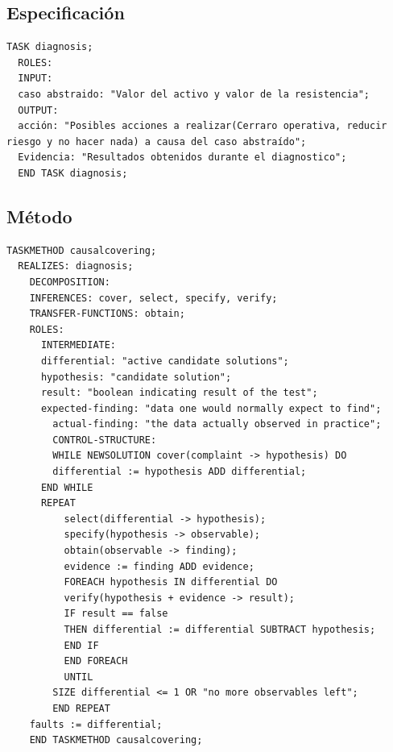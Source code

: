 \subsection{Especificación}

\begin{lstlisting}[style=Python-color, caption={Pseudocódigo de la especificación}]
  TASK diagnosis;
  ROLES:
  INPUT: 
  caso abstraido: "Valor del activo y valor de la resistencia";
  OUTPUT:
  acción: "Posibles acciones a realizar(Cerraro operativa, reducir riesgo y no hacer nada) a causa del caso abstraído";
  Evidencia: "Resultados obtenidos durante el diagnostico";
  END TASK diagnosis;
\end{lstlisting}

\subsection{Método}

\begin{lstlisting}[style=Python-color, caption={Pseudocódigo de Completo}]  
  TASKMETHOD causalcovering;
  REALIZES: diagnosis;
    DECOMPOSITION:
    INFERENCES: cover, select, specify, verify;
    TRANSFER-FUNCTIONS: obtain;
    ROLES:
      INTERMEDIATE:
      differential: "active candidate solutions";
      hypothesis: "candidate solution";
      result: "boolean indicating result of the test";
      expected-finding: "data one would normally expect to find";
        actual-finding: "the data actually observed in practice";
        CONTROL-STRUCTURE:
        WHILE NEWSOLUTION cover(complaint -> hypothesis) DO
        differential := hypothesis ADD differential;
      END WHILE
      REPEAT
          select(differential -> hypothesis);
          specify(hypothesis -> observable);
          obtain(observable -> finding);
          evidence := finding ADD evidence;
          FOREACH hypothesis IN differential DO
          verify(hypothesis + evidence -> result);
          IF result == false
          THEN differential := differential SUBTRACT hypothesis;
          END IF
          END FOREACH
          UNTIL
        SIZE differential <= 1 OR "no more observables left";
        END REPEAT
    faults := differential;
    END TASKMETHOD causalcovering;
\end{lstlisting}


